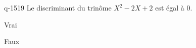 \begin{truefalse}{q-1519}
Le discriminant du trinôme $X^2-2X+2$ est égal à $0$.
\item Vrai
\item* Faux
\end{truefalse}

